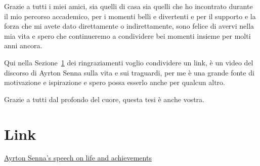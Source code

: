 \documentclass{Configuration_Files/PoliMi3i_thesis}
\begin{document}
Grazie a tutti i miei amici, sia quelli di casa sia quelli che ho incontrato durante il mio percorso accademico, per i momenti belli e divertenti e per il supporto e la forza che mi 
avete dato direttamente o indirettamente, sono felice di avervi nella mia vita e spero che continueremo a condividere bei momenti insieme per molti anni ancora.

Qui nella Sezione~\ref{sec:link} dei ringraziamenti voglio condividere un link, è un video del discorso di Ayrton Senna sulla vita e sui traguardi, per me è una grande fonte di motivazione e ispirazione
e spero possa esserlo anche per qualcun altro.

Grazie a tutti dal profondo del cuore, questa tesi è anche vostra.

\section{Link}
\label{sec:link}
\begin{center}

    \vspace{1cm}
    \small
    \href{https://youtu.be/nyNwoVRikoc}{Ayrton Senna's speech on life and achievements}

\end{center}

\endgroup


\cleardoublepage
\end{document}
